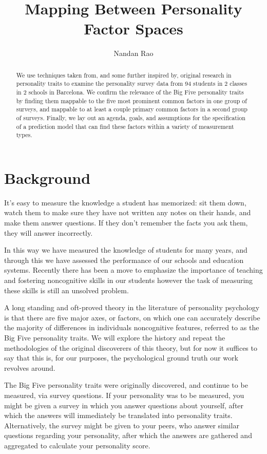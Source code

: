 \documentclass[a4paper,12pt]{article}
\begin{document}
\title{Mapping Between Personality Factor Spaces}

\author{Nandan Rao}

\maketitle

\begin{abstract}
  We use techniques taken from, and some further inspired by, original research in personality traits to examine the personality survey data from 94 students in 2 classes in 2 schools in Barcelona. We confirm the relevance of the Big Five personality traits by finding them mappable to the five most prominent common factors in one group of surveys, and mappable to at least a couple primary common factors in a second group of surveys. Finally, we lay out an agenda, goals, and assumptions for the specification of a prediction model that can find these factors within a variety of measurement types.

\end{abstract}

\section{Background}
It's easy to measure the knowledge a student has memorized: sit them down, watch them to make sure they have not written any notes on their hands, and make them answer questions. If they don't remember the facts you ask them, they will answer incorrectly.

In this way we have measured the knowledge of students for many years, and through this we have assessed the performance of our schools and education systems. Recently there has been a move to emphasize the importance of teaching and fostering noncognitive skills in our students however the task of measuring these skills is still an unsolved problem.

A long standing and oft-proved theory in the literature of personality psychology is that there are five major axes, or factors, on which one can accurately describe the majority of differences in individuals noncognitive features, referred to as the Big Five personality traits. We will explore the history and repeat the methodologies of the original discoverers of this theory, but for now it suffices to say that this is, for our purposes, the psychological ground truth our work revolves around.

The Big Five personality traits were originally discovered, and continue to be measured, via survey questions. If your personality was to be measured, you might be given a survey in which you answer questions about yourself, after which the answers will immediately be translated into personality traits. Alternatively, the survey might be given to your peers, who answer similar questions regarding your personality, after which the answers are gathered and aggregated to calculate your personality score.
\end{document}
